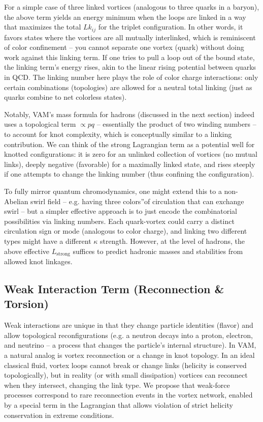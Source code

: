 For a simple case of three linked vortices (analogous to three quarks in a baryon), the above term yields an energy minimum when the loops are linked in a way that maximizes the total $Lk_{ij}$ for the triplet configuration. In other words, it favors states where the vortices are all mutually interlinked, which is reminiscent of color confinement – you cannot separate one vortex (quark) without doing work against this linking term. If one tries to pull a loop out of the bound state, the linking term's energy rises, akin to the linear rising potential between quarks in QCD. The linking number here plays the role of color charge interactions: only certain combinations (topologies) are allowed for a neutral total linking (just as quarks combine to net colorless states).


Notably, VAM's mass formula for hadrons (discussed in the next section) indeed uses a topological term $\propto p q$ – essentially the product of two winding numbers – to account for knot complexity, which is conceptually similar to a linking contribution. We can think of the strong Lagrangian term as a potential well for knotted configurations: it is zero for an unlinked collection of vortices (no mutual links), deeply negative (favorable) for a maximally linked state, and rises steeply if one attempts to change the linking number (thus confining the configuration).


To fully mirror quantum chromodynamics, one might extend this to a non-Abelian swirl field – e.g. having three \grqq colors\textquotedblright of circulation that can exchange swirl – but a simpler effective approach is to just encode the combinatorial possibilities via linking numbers. Each quark-vortex could carry a distinct circulation sign or mode (analogous to color charge), and linking two different types might have a different $\kappa$ strength. However, at the level of hadrons, the above effective $L_{\text{strong}}$ suffices to predict hadronic masses and stabilities from allowed knot linkages.


\subsection{Weak Interaction Term (Reconnection \& Torsion)}

Weak interactions are unique in that they change particle identities (flavor) and allow topological reconfigurations (e.g. a neutron decays into a proton, electron, and neutrino – a process that changes the particle's internal structure). In VAM, a natural analog is vortex reconnection or a change in knot topology. In an ideal classical fluid, vortex loops cannot break or change links (helicity is conserved topologically), but in reality (or with small dissipation) vortices can reconnect when they intersect, changing the link type. We propose that weak-force processes correspond to rare reconnection events in the vortex network, enabled by a special term in the Lagrangian that allows violation of strict helicity conservation in extreme conditions.


